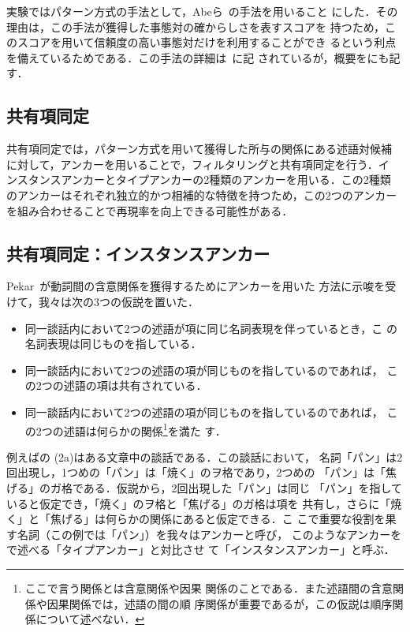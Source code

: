 \documentclass[japanese]{jnlp_1.4}
\begin{document}
実験ではパターン方式の手法として，Abeら~\cite{abe:08}の手法を用いること
にした．その理由は，この手法が獲得した事態対の確からしさを表すスコアを
持つため，このスコアを用いて信頼度の高い事態対だけを利用することができ
るという利点を備えているためである．この手法の詳細は~\cite{abe:08}に記
されているが，概要をにも記す．


\subsection{共有項同定}
\label{ssec:shared_case}

共有項同定では，パターン方式を用いて獲得した所与の関係にある述語対候補
に対して，アンカーを用いることで，フィルタリングと共有項同定を行う．イ
ンスタンスアンカーとタイプアンカーの2種類のアンカーを用いる．この2種類
のアンカーはそれぞれ独立的かつ相補的な特徴を持つため，この2つのアンカー
を組み合わせることで再現率を向上できる可能性がある．


\subsection{共有項同定：インスタンスアンカー}
\label{ssec:instance_anc}

Pekar~\cite{pekar:06}が動詞間の含意関係を獲得するためにアンカーを用いた
方法に示唆を受けて，我々は次の3つの仮説を置いた．
\begin{itemize}
\item 同一談話内において2つの述語が項に同じ名詞表現を伴っているとき，こ
  の名詞表現は同じものを指している．
\item 同一談話内において2つの述語の項が同じものを指しているのであれば，
  この2つの述語の項は共有されている．
\item 同一談話内において2つの述語の項が同じものを指しているのであれば，
  この2つの述語は何らかの関係\footnote{ここで言う関係とは含意関係や因果
    関係のことである．また述語間の含意関係や因果関係では，述語の間の順
    序関係が重要であるが，この仮説は順序関係について述べない．}を満た
  す．
\end{itemize}
例えばの (2a)はある文章中の談話である．この談話において，
名詞「パン」は2回出現し，1つめの「パン」は「焼く」のヲ格であり，2つめの
「パン」は「焦げる」のガ格である．仮説から，2回出現した「パン」は同じ
「パン」を指していると仮定でき，「焼く」のヲ格と「焦げる」のガ格は項を
共有し，さらに「焼く」と「焦げる」は何らかの関係にあると仮定できる．こ
こで重要な役割を果す名詞（この例では「パン」）を我々はアンカーと呼び，
このようなアンカーをで述べる「タイプアンカー」と対比させ
て「インスタンスアンカー」と呼ぶ．
\end{document}
